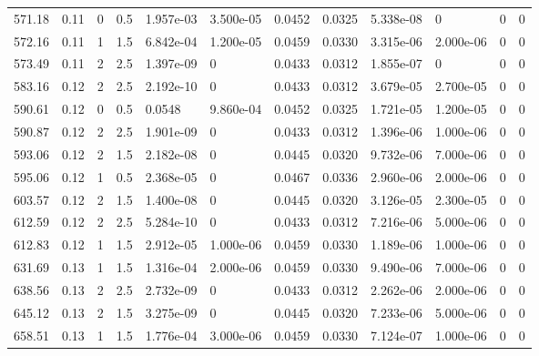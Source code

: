 \documentclass[preview]{standalone}
\begin{document}
{{{\begin{tabular}{L{1.2cm}C{1.2cm} C{0.3cm}C{0.5cm} C{1.4cm}C{1.4cm} C{1.4cm}C{1.4cm} C{1.6cm}C{1.6cm} C{1.6cm}C{1.6cm}}
  571.18  &  0.11  & 0     & 0.5 &  1.957e-03  & 3.500e-05  &  0.0452&   0.0325& 5.338e-08 & 0   &  0 & 0  \\ 
  572.16  &  0.11  & 1     & 1.5 &  6.842e-04  & 1.200e-05  &  0.0459&   0.0330& 3.315e-06 & 2.000e-06   &  0 & 0  \\ 
  573.49  &  0.11  & 2     & 2.5 &  1.397e-09  & 0  &  0.0433&   0.0312& 1.855e-07 & 0   &  0 & 0  \\ 
  583.16  &  0.12  & 2     & 2.5 &  2.192e-10  & 0  &  0.0433&   0.0312& 3.679e-05 & 2.700e-05   &  0 & 0  \\ 
  590.61  &  0.12  & 0     & 0.5 &  0.0548  & 9.860e-04  &  0.0452&   0.0325& 1.721e-05 & 1.200e-05   &  0 & 0  \\ 
  590.87  &  0.12  & 2     & 2.5 &  1.901e-09  & 0  &  0.0433&   0.0312& 1.396e-06 & 1.000e-06   &  0 & 0  \\ 
  593.06  &  0.12  & 2     & 1.5 &  2.182e-08  & 0  &  0.0445&   0.0320& 9.732e-06 & 7.000e-06   &  0 & 0  \\ 
  595.06  &  0.12  & 1     & 0.5 &  2.368e-05  & 0  &  0.0467&   0.0336& 2.960e-06 & 2.000e-06   &  0 & 0  \\ 
  603.57  &  0.12  & 2     & 1.5 &  1.400e-08  & 0  &  0.0445&   0.0320& 3.126e-05 & 2.300e-05   &  0 & 0  \\ 
  612.59  &  0.12  & 2     & 2.5 &  5.284e-10  & 0  &  0.0433&   0.0312& 7.216e-06 & 5.000e-06   &  0 & 0  \\ 
  612.83  &  0.12  & 1     & 1.5 &  2.912e-05  & 1.000e-06  &  0.0459&   0.0330& 1.189e-06 & 1.000e-06   &  0 & 0  \\ 
  631.69  &  0.13  & 1     & 1.5 &  1.316e-04  & 2.000e-06  &  0.0459&   0.0330& 9.490e-06 & 7.000e-06   &  0 & 0  \\ 
  638.56  &  0.13  & 2     & 2.5 &  2.732e-09  & 0  &  0.0433&   0.0312& 2.262e-06 & 2.000e-06   &  0 & 0  \\ 
  645.12  &  0.13  & 2     & 1.5 &  3.275e-09  & 0  &  0.0445&   0.0320& 7.233e-06 & 5.000e-06   &  0 & 0  \\ 
  658.51  &  0.13  & 1     & 1.5 &  1.776e-04  & 3.000e-06  &  0.0459&   0.0330& 7.124e-07 & 1.000e-06   &  0 & 0  \\ 
\hline 
\end{tabular} 

}}}
\end{document}
